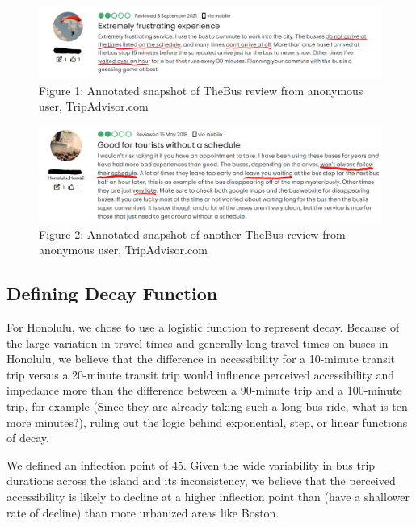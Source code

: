 \documentclass[
]{article}
\begin{document}
\begin{figure}

{\centering \includegraphics[width=1\linewidth]{A5 Images/Review-1} 

}

\caption{Figure 1: Annotated snapshot of TheBus review from anonymous user, TripAdvisor.com}\label{fig:figurename1}
\end{figure}

\begin{figure}

{\centering \includegraphics[width=1\linewidth]{A5 Images/Review-2} 

}

\caption{Figure 2: Annotated snapshot of another TheBus review from anonymous user, TripAdvisor.com}\label{fig:figurename2}
\end{figure}

\hypertarget{defining-decay-function}{%
\subsection{Defining Decay Function}\label{defining-decay-function}}

For Honolulu, we chose to use a logistic function to represent decay.
Because of the large variation in travel times and generally long travel
times on buses in Honolulu, we believe that the difference in
accessibility for a 10-minute transit trip versus a 20-minute transit
trip would influence perceived accessibility and impedance more than the
difference between a 90-minute trip and a 100-minute trip, for example
(Since they are already taking such a long bus ride, what is ten more
minutes?), ruling out the logic behind exponential, step, or linear
functions of decay.

We defined an inflection point of 45. Given the wide variability in bus
trip durations across the island and its inconsistency, we believe that
the perceived accessibility is likely to decline at a higher inflection
point than (have a shallower rate of decline) than more urbanized areas
like Boston.
\end{document}
